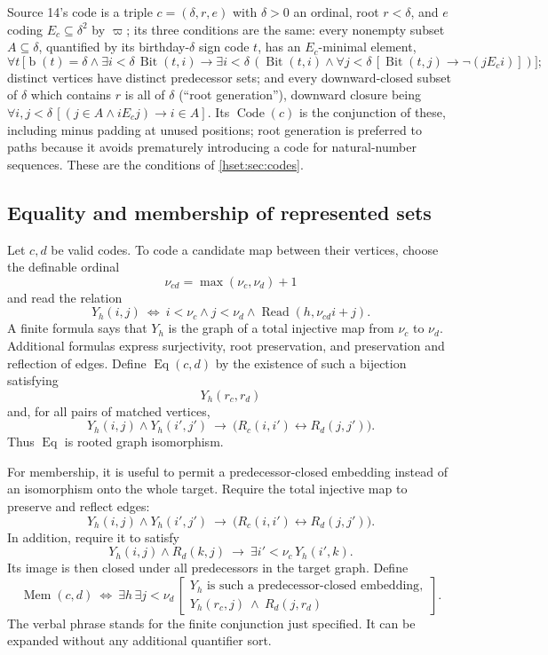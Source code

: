 \documentclass[11pt,letterpaper]{article}
\theoremstyle{definition}
\theoremstyle{remark}
\newcommand{\bd}{\operatorname{b}}
\newcommand{\Code}{\operatorname{Code}}
\newcommand{\Bit}{\operatorname{Bit}}
\newcommand{\Readp}{\operatorname{Read}}
\newcommand{\Eqc}{\operatorname{Eq}}
\newcommand{\Memc}{\operatorname{Mem}}
\begin{document}
Source 14's code is a triple $c=(\delta,r,e)$ with $\delta>0$ an ordinal, root
$r<\delta$, and $e$ coding $E_c\subseteq\delta^2$ by $\varpi$; its three
conditions are the same: every nonempty subset $A\subseteq\delta$, quantified by
its birthday-$\delta$ sign code $t$, has an $E_c$-minimal element,
\[
 \forall t\,\bigl[\bd(t)=\delta\land\exists i<\delta\,\Bit(t,i)\longrightarrow
 \exists i<\delta\,(\Bit(t,i)\land\forall j<\delta\,[\Bit(t,j)\to\neg(jE_ci)])\bigr];
\]
distinct vertices have distinct predecessor sets; and every downward-closed subset
of $\delta$ which contains $r$ is all of $\delta$ (``root generation''), downward
closure being $\forall i,j<\delta\,[(j\in A\land iE_cj)\to i\in A]$. Its
$\Code(c)$ is the conjunction of these, including minus padding at unused
positions; root generation is preferred to paths because it avoids prematurely
introducing a code for natural-number sequences. These are the conditions of
\cref{hset:sec:codes}.

\subsection{Equality and membership of represented sets}

Let $c,d$ be valid codes. To code a candidate map between their vertices, choose
the definable ordinal
\[
 \nu_{cd}=\max(\nu_c,\nu_d)+1
\]
and read the relation
\[
 Y_h(i,j)\ \Longleftrightarrow\ i<\nu_c\land j<\nu_d\land\Readp(h,\nu_{cd}i+j).
\]
A finite formula says that $Y_h$ is the graph of a total injective map from
$\nu_c$ to $\nu_d$. Additional formulas express surjectivity, root preservation,
and preservation and reflection of edges. Define $\Eqc(c,d)$ by the existence of
such a bijection satisfying
\[
 Y_h(r_c,r_d)
\]
and, for all pairs of matched vertices,
\[
 Y_h(i,j)\land Y_h(i',j')\ \longrightarrow\ \bigl(R_c(i,i')\longleftrightarrow R_d(j,j')\bigr).
\]
Thus $\Eqc$ is rooted graph isomorphism.

For membership, it is useful to permit a predecessor-closed embedding instead of
an isomorphism onto the whole target. Require the total injective map to preserve
and reflect edges:
\[
 Y_h(i,j)\land Y_h(i',j')\ \longrightarrow\ \bigl(R_c(i,i')\longleftrightarrow R_d(j,j')\bigr).
\]
In addition, require it to satisfy
\[
 Y_h(i,j)\land R_d(k,j)\ \longrightarrow\ \exists i'<\nu_c\,Y_h(i',k).
\]
Its image is then closed under all predecessors in the target graph. Define
\begin{equation}\label{hset:sf:eq:mem}
 \Memc(c,d)\ \Longleftrightarrow\ \exists h\,\exists j<\nu_d\,
 \left[\begin{array}{l}
 Y_h\text{ is such a predecessor-closed embedding},\\
 Y_h(r_c,j)\ \land\ R_d(j,r_d)
 \end{array}\right].
\end{equation}
The verbal phrase stands for the finite conjunction just specified. It can be
expanded without any additional quantifier sort.
\end{document}
